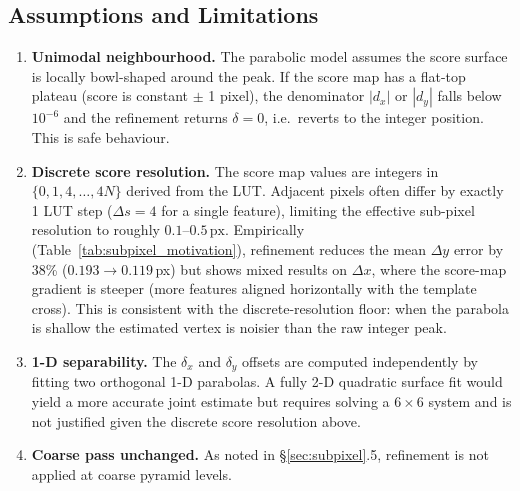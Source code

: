 \documentclass[12pt,a4paper]{article}
\begin{document}
\subsection{Assumptions and Limitations}

\begin{enumerate}
  \item \textbf{Unimodal neighbourhood.}  The parabolic model assumes the
        score surface is locally bowl-shaped around the peak.  If the score
        map has a flat-top plateau (score is constant $\pm$ 1 pixel), the
        denominator $|d_x|$ or $|d_y|$ falls below $10^{-6}$ and the
        refinement returns $\delta = 0$, i.e.\ reverts to the integer
        position.  This is safe behaviour.

  \item \textbf{Discrete score resolution.}  The score map values are
        integers in $\{0, 1, 4, \ldots, 4N\}$ derived from the LUT.
        Adjacent pixels often differ by exactly 1 LUT step ($\Delta s = 4$
        for a single feature), limiting the effective sub-pixel resolution
        to roughly $0.1$--$0.5\,\text{px}$.  Empirically (Table~\ref{tab:subpixel_motivation}),
        refinement reduces the mean $\Delta y$ error by 38\% ($0.193 \to 0.119$\,px)
        but shows mixed results on $\Delta x$, where the score-map gradient
        is steeper (more features aligned horizontally with the template cross).
        This is consistent with the discrete-resolution floor: when the parabola
        is shallow the estimated vertex is noisier than the raw integer peak.

  \item \textbf{1-D separability.}  The $\delta_x$ and $\delta_y$ offsets
        are computed independently by fitting two orthogonal 1-D parabolas.
        A fully 2-D quadratic surface fit would yield a more accurate joint
        estimate but requires solving a $6 \times 6$ system and is not
        justified given the discrete score resolution above.

  \item \textbf{Coarse pass unchanged.}  As noted in
        §\ref{sec:subpixel}.5, refinement is not applied at coarse pyramid
        levels.
\end{enumerate}
\end{document}
